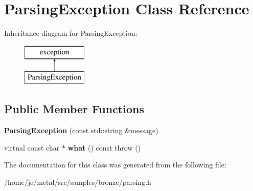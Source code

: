 \hypertarget{classParsingException}{}\section{Parsing\+Exception Class Reference}
\label{classParsingException}
Inheritance diagram for Parsing\+Exception\+:\begin{figure}[H]
\begin{center}
\leavevmode
\includegraphics[height=2.000000cm]{classParsingException}
\end{center}
\end{figure}
\subsection*{Public Member Functions}
\begin{DoxyCompactItemize}
\item 
\hypertarget{classParsingException_abf65f376a5104a21889b11ce09d43153}{}{\bfseries Parsing\+Exception} (const std\+::string \&message)\label{classParsingException_abf65f376a5104a21889b11ce09d43153}

\item 
\hypertarget{classParsingException_a4fe12185d9e97fb457fb68e5a5236ed4}{}virtual const char $\ast$ {\bfseries what} () const   throw ()\label{classParsingException_a4fe12185d9e97fb457fb68e5a5236ed4}

\end{DoxyCompactItemize}


The documentation for this class was generated from the following file\+:\begin{DoxyCompactItemize}
\item 
/home/jc/metal/src/samples/bronze/parsing.\+h\end{DoxyCompactItemize}
